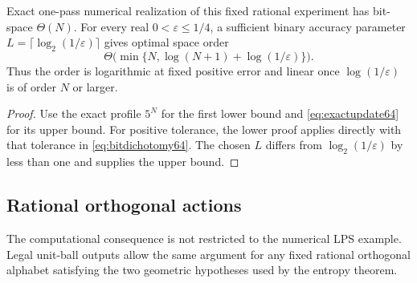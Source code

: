 \begin{corollary}\label{cor:allprecision64}
Exact one-pass numerical realization of this fixed rational experiment
has bit-space $\Theta(N)$. For every real $0<\varepsilon\le1/4$, a
sufficient binary accuracy parameter $L=\lceil\log_2(1/\varepsilon)\rceil$
gives optimal space order
\[
              \Theta\bigl(\min\{N,\log(N+1)+\log(1/\varepsilon)\}\bigr).
\]
Thus the order is logarithmic at fixed positive error and linear once
$\log(1/\varepsilon)$ is of order $N$ or larger.
\end{corollary}
\begin{proof}
Use the exact profile $5^N$ for the first lower bound and
\eqref{eq:exactupdate64} for its upper bound. For positive tolerance,
the lower proof applies directly with that tolerance in
\eqref{eq:bitdichotomy64}. The chosen $L$ differs from
$\log_2(1/\varepsilon)$ by less than one and supplies the upper bound.
\end{proof}

\subsection{Rational orthogonal actions}
The computational consequence is not restricted to the numerical LPS
example. Legal unit-ball outputs allow the same argument for any fixed
rational orthogonal alphabet satisfying the two geometric hypotheses
used by the entropy theorem.

